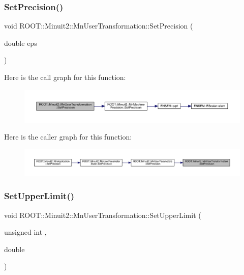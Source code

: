 \subsubsection{\texorpdfstring{SetPrecision()}{SetPrecision()}\hspace{0.1cm}{\footnotesize\ttfamily [3/3]}}
{\footnotesize\ttfamily void R\+O\+O\+T\+::\+Minuit2\+::\+Mn\+User\+Transformation\+::\+Set\+Precision (\begin{DoxyParamCaption}\item[{double}]{eps }\end{DoxyParamCaption})\hspace{0.3cm}{\ttfamily [inline]}}

Here is the call graph for this function\+:
\nopagebreak
\begin{figure}[H]
\begin{center}
\leavevmode
\includegraphics[width=350pt]{d9/d98/classROOT_1_1Minuit2_1_1MnUserTransformation_aa80f289974f19753a2912a8eb6311f53_cgraph}
\end{center}
\end{figure}
Here is the caller graph for this function\+:
\nopagebreak
\begin{figure}[H]
\begin{center}
\leavevmode
\includegraphics[width=350pt]{d9/d98/classROOT_1_1Minuit2_1_1MnUserTransformation_aa80f289974f19753a2912a8eb6311f53_icgraph}
\end{center}
\end{figure}
\mbox{\label{classROOT_1_1Minuit2_1_1MnUserTransformation_a276c83d584ef857cd2b69ecc04cfab01}} 
\subsubsection{\texorpdfstring{SetUpperLimit()}{SetUpperLimit()}\hspace{0.1cm}{\footnotesize\ttfamily [1/6]}}
{\footnotesize\ttfamily void R\+O\+O\+T\+::\+Minuit2\+::\+Mn\+User\+Transformation\+::\+Set\+Upper\+Limit (\begin{DoxyParamCaption}\item[{unsigned int}]{,  }\item[{double}]{ }\end{DoxyParamCaption})}

